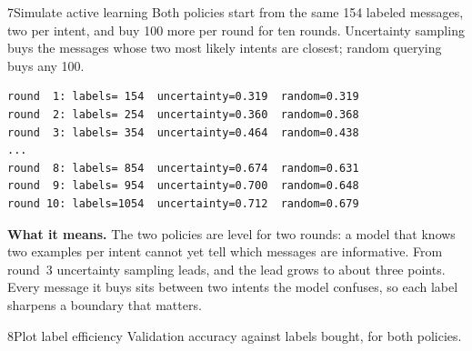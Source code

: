 \begin{labquestion}{7}{Simulate active learning}
Both policies start from the same 154 labeled messages, two per intent, and buy 100 more per round for ten rounds. Uncertainty sampling buys the messages whose two most likely intents are closest; random querying buys any 100.
\end{labquestion}
\begin{labanswer}

\begin{refoutput}
\begin{lstlisting}[style=utpterminal]
round  1: labels= 154  uncertainty=0.319  random=0.319
round  2: labels= 254  uncertainty=0.360  random=0.368
round  3: labels= 354  uncertainty=0.464  random=0.438
...
round  8: labels= 854  uncertainty=0.674  random=0.631
round  9: labels= 954  uncertainty=0.700  random=0.648
round 10: labels=1054  uncertainty=0.712  random=0.679
\end{lstlisting}
\end{refoutput}

\textbf{What it means.} The two policies are level for two rounds: a model that knows two examples per intent cannot yet tell which messages are informative. From round~3 uncertainty sampling leads, and the lead grows to about three points. Every message it buys sits between two intents the model confuses, so each label sharpens a boundary that matters.
\end{labanswer}

\begin{labquestion}{8}{Plot label efficiency}
Validation accuracy against labels bought, for both policies.
\end{labquestion}
\begin{labanswer}

\end{labanswer}

